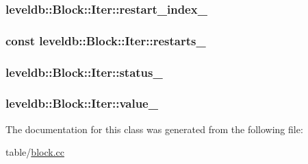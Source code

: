\subsubsection[{restart\+\_\+index\+\_\+}]{ leveldb\+::\+Block\+::\+Iter\+::restart\+\_\+index\+\_\+\hspace{0.3cm}{\ttfamily [private]}}\label{classleveldb_1_1_block_1_1_iter_aa4b7cc02f507cb8c6661a69a885e6e77}
\hypertarget{classleveldb_1_1_block_1_1_iter_a29cd82a678d189009044c54c3e22ba24}{}
\subsubsection[{restarts\+\_\+}]{ const leveldb\+::\+Block\+::\+Iter\+::restarts\+\_\+\hspace{0.3cm}{\ttfamily [private]}}\label{classleveldb_1_1_block_1_1_iter_a29cd82a678d189009044c54c3e22ba24}
\hypertarget{classleveldb_1_1_block_1_1_iter_a66460e3f29991e34d6435d2e13edd920}{}
\subsubsection[{status\+\_\+}]{ leveldb\+::\+Block\+::\+Iter\+::status\+\_\+\hspace{0.3cm}{\ttfamily [private]}}\label{classleveldb_1_1_block_1_1_iter_a66460e3f29991e34d6435d2e13edd920}
\hypertarget{classleveldb_1_1_block_1_1_iter_a5af74baeadb7f39bb6fa5da621fe04e0}{}
\subsubsection[{value\+\_\+}]{ leveldb\+::\+Block\+::\+Iter\+::value\+\_\+\hspace{0.3cm}{\ttfamily [private]}}\label{classleveldb_1_1_block_1_1_iter_a5af74baeadb7f39bb6fa5da621fe04e0}


The documentation for this class was generated from the following file\+:\begin{DoxyCompactItemize}
\item 
table/\hyperlink{block_8cc}{block.\+cc}\end{DoxyCompactItemize}
